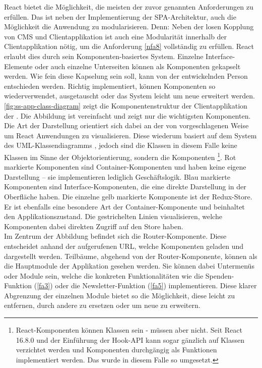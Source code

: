 React bietet die Möglichkeit, die meisten der zuvor genannten Anforderungen zu erfüllen. 
Das ist neben der Implementierung der SPA-Architektur, auch die Möglichkeit die 
Anwendung zu modularisieren. Denn: Neben der losen Kopplung von CMS und Clientapplikation
ist auch eine Modularität innerhalb der Clientapplikation nötig, um die Anforderung \ref{nfa8}
vollständig zu erfüllen. React erlaubt dies durch sein Komponenten-basiertes System. Einzelne
Interface-Elemente oder auch einzelne Unterseiten können als Komponenten gekapselt werden.
Wie fein diese Kapselung sein soll, kann von der entwickelnden Person entschieden werden. Richtig implementiert,
können Komponenten so wiederverwendet, ausgetauscht oder das System leicht um neue erweitert werden.\\
\autoref{fig:ss-app-class-diagram} zeigt die Komponentenstruktur der Clientapplikation der \shst{}.
Die Abbildung ist vereinfacht und zeigt nur die wichtigsten Komponenten. Die Art der Darstellung
orientiert sich dabei an der von  vorgeschlagenen Weise um React Anwendungen
zu visualisieren. Diese wiederum basiert auf dem System des UML-Klassendiagramms \cite{uml-spec}, 
jedoch sind die Klassen in diesem Falle keine Klassen im Sinne der Objektorientierung, sondern die Komponenten 
\footnote{React-Komponenten können Klassen sein - müssen aber nicht. Seit React 16.8.0 und
der Einführung der Hook-API \cite{react-hooks} kann sogar gänzlich auf Klassen verzichtet werden und Komponenten 
durchgängig als Funktionen implementiert werden. Das wurde in diesem Falle so umgesetzt.}.
Rot markierte Komponenten sind Container-Komponenten und haben keine eigene Darstellung -- sie implementieren
lediglich Geschäftslogik. Blau markierte Komponenten sind Interface-Komponenten, die eine direkte 
Darstellung in der Oberfläche haben. Die einzelne gelb markierte Komponente ist der Redux-Store. 
Er ist ebenfalls eine besondere Art der Container-Komponente und beinhaltet den Applikationszustand. 
Die gestrichelten Linien visualisieren, welche Komponenten dabei direkten Zugriff auf den 
Store haben.\\
Im Zentrum der Abbildung befindet sich die Router-Komponente. Diese entscheidet anhand der aufgerufenen
URL, welche Komponenten geladen und dargestellt werden. Teilbäume, abgehend von der Router-Komponente, können als
die Hauptmodule der Applikation gesehen werden. Sie können dabei Untermenüs oder Module sein, welche
die konkreten Funktionalitäten wie die Spenden-Funktion (\ref{fa3}) oder die Newsletter-Funktion (\ref{fa5}) 
implementieren. Diese klarer Abgrenzung der einzelnen Module bietet so die Möglichkeit, diese leicht
zu entfernen, durch andere zu ersetzen oder um neue zu erweitern.\\

